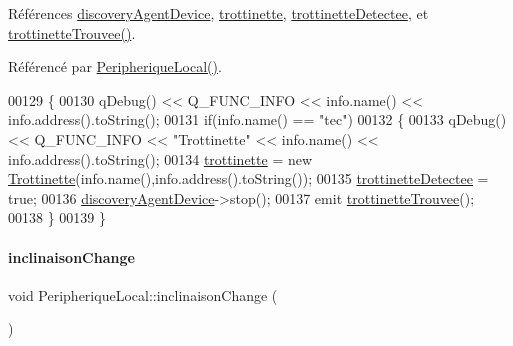 Références \hyperlink{class_peripherique_local_a9e398b7dd89a20b1bee67b8c3467da69}{discovery\+Agent\+Device}, \hyperlink{class_peripherique_local_aa110b2c3292270553f592362e45f710b}{trottinette}, \hyperlink{class_peripherique_local_af6f664b6af67f1c90eb017391ac812ed}{trottinette\+Detectee}, et \hyperlink{class_peripherique_local_ad388116a3ad558055dcf02fa854ab361}{trottinette\+Trouvee()}.



Référencé par \hyperlink{class_peripherique_local_a99a652b8659a3692f164cf1a0382e4bf}{Peripherique\+Local()}.


\begin{DoxyCode}
00129 \{
00130     qDebug() << Q\_FUNC\_INFO << info.name() << info.address().toString();
00131     \textcolor{keywordflow}{if}(info.name() == \textcolor{stringliteral}{"tec"})
00132     \{
00133         qDebug() << Q\_FUNC\_INFO << \textcolor{stringliteral}{"Trottinette"} << info.name() << info.address().toString();
00134         \hyperlink{class_peripherique_local_aa110b2c3292270553f592362e45f710b}{trottinette} = \textcolor{keyword}{new} \hyperlink{class_trottinette}{Trottinette}(info.name(),info.address().toString());
00135         \hyperlink{class_peripherique_local_af6f664b6af67f1c90eb017391ac812ed}{trottinetteDetectee} = \textcolor{keyword}{true};
00136         \hyperlink{class_peripherique_local_a9e398b7dd89a20b1bee67b8c3467da69}{discoveryAgentDevice}->stop();
00137         emit \hyperlink{class_peripherique_local_ad388116a3ad558055dcf02fa854ab361}{trottinetteTrouvee}();
00138     \}
00139 \}
\end{DoxyCode}
\mbox{\label{class_peripherique_local_a9854fcde7556478f343b4a571864445a}} 
\paragraph{\texorpdfstring{inclinaison\+Change}{inclinaisonChange}}
{\footnotesize\ttfamily void Peripherique\+Local\+::inclinaison\+Change (\begin{DoxyParamCaption}{ }\end{DoxyParamCaption})\hspace{0.3cm}{\ttfamily [signal]}}

\mbox{\label{class_peripherique_local_a017f86e371bad418585d28b97557248a}} 
